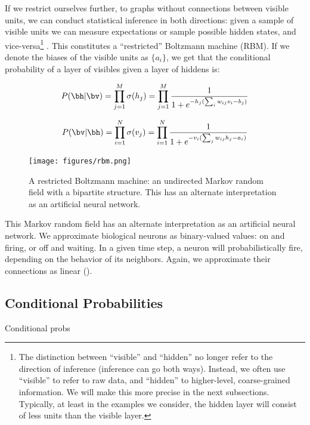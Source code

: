 If we restrict ourselves further, to graphs without connections
between visible units, we can conduct statistical inference in both
directions: given a sample of visible units we can measure
expectations or sample possible hidden states, and
vice-versa\footnote{The distinction between ``visible'' and ``hidden''
  no longer refer to the direction of inference (inference can go both
  ways).  Instead, we often use ``visible'' to refer to raw data, and
  ``hidden'' to higher-level, coarse-grained information.  We will
  make this more precise in the next subsections. Typically, at least
  in the examples we consider, the hidden layer will consist of less
  units than the visible layer.} . This constitutes a
``restricted'' Boltzmann machine (RBM). If we denote the biases of the
visible units as $\{a_i\}$, we get that the conditional probability of
a layer of visibles given a layer of hiddens is:%

\begin{equation}%
  P(\bh|\bv)=\prod_{j=1}^M \sigma(h_j)=\prod_{j=1}^M \frac{1}{1+e^{-h_j(\sum_i w_{ij} v_i - b_j )}}
\end{equation}%

\begin{equation}%
  P(\bv|\bh)=\prod_{i=1}^N \sigma(v_j)=\prod_{i=1}^N \frac{1}{1+e^{-v_i(\sum_j w_{ij} h_j - a_i )}}
\end{equation}%

\begin{figure}[ht]
  \centering
  \texttt{[image: figures/rbm.png]}
  \caption{A restricted Boltzmann machine: an undirected Markov random
    field with a bipartite structure. This has an alternate
    interpretation as an artificial neural network.\label{fig:rbm} }
\end{figure}

This Markov random field has an alternate interpretation as an
artificial neural network. We approximate biological neurons as
binary-valued values: on and firing, or off and waiting. In a given
time step, a neuron will probabilistically fire, depending on the
behavior of its neighbors. Again, we approximate their connections as
linear ().


\subsection{Conditional Probabilities}\label{sec:rbm-conditional-dist}

Conditional probs



